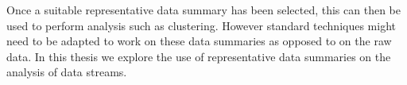 Once a suitable representative data summary has been selected,  this can then be used to perform analysis such as clustering. However standard techniques might need to be adapted to work on these data summaries as opposed to on the raw data. In this thesis we explore the use of representative data summaries on the analysis of data streams.


